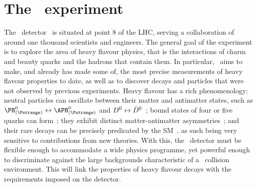 \chapter{The \lhcb\ experiment}
\label{chap:intro:lhcb}

The \lhcb\ detector~\cite{Alves:2008zz,Aaij:2014jba} is situated at point 8 of 
the \ac{LHC}, serving a collaboration of around one thousand scientists and 
engineers.
The general goal of the experiment is to explore the area of heavy flavour 
physics, that is the interactions of charm and beauty quarks and the hadrons 
that contain them.
In particular, \lhcb\ aims to make, and already has made some of, the most 
precise measurements of heavy flavour properties to date, as well as to 
discover decays and particles that were not observed by previous experiments.
Heavy flavour has a rich phenomenology: neutral particles can oscillate between 
their matter and antimatter states, such as $\PBds \leftrightarrow \APBds$ and 
$D^{0} \leftrightarrow \bar{D}^{0}$~\cite{Abulencia:2006ze,Aaij:2012nva}; bound 
states of four or five quarks can form~\cite{Aaij:2014jqa,Aaij:2015tga}; they 
exhibit distinct matter-antimatter 
asymmetries~\cite{Aubert:2001nu,Abe:2001xe,Aaij:2012kz,Aaij:2013iua,Aaij:2016cla}; 
and their rare decays can be precisely predicated by the 
\ac{SM}~\cite{CMS:2014xfa,Aaij:2015oid}, as such being very sensitive to 
contributions from new theories.
With this, the \lhcb\ detector must be flexible enough to accommodate a wide 
physics programme, yet powerful enough to discriminate against the large 
backgrounds characteristic of a \pp\ collision environment.
This  will link the properties of heavy flavour 
decays with the requirements imposed on the detector.

